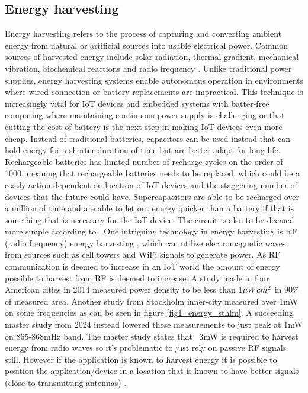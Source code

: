 \documentclass[article,a4paper]{IEEEtran}
\begin{document}
\subsection{Energy harvesting}
Energy harvesting refers to the process of capturing and converting ambient energy from natural or artificial sources into usable electrical power. Common sources of harvested energy include solar radiation, thermal gradient, mechanical vibration, biochemical reactions and radio frequency \cite{Energyharvest1}. Unlike traditional power supplies, energy harvesting systems enable autonomous operation in environments where wired connection or battery replacements are impractical. This technique is increasingly vital for IoT devices and embedded systems with batter-free computing where maintaining continuous power supply is challenging or that cutting the cost of battery is the next step in making IoT devices even more cheap. Instead of traditional batteries, capacitors can be used instead that can hold energy for a shorter duration of time but are better adapt for long life. Rechargeable batteries has limited number of recharge cycles on the order of 1000, meaning that rechargeable batteries needs to be replaced, which could be a costly action dependent on location of IoT devices and the staggering number of devices that the future could have. Supercapacitors are able to be recharged over a million of time and are able to let out energy quicker than a battery if that is something that is necessary for the IoT device. The circuit is also to be deemed more simple according to \cite{Energyharvest1}. 
\newline\newline 
One intriguing technology in energy harvesting is RF (radio frequency) energy harvesting \cite{RF_energy_harvest}, which can utilize electromagnetic waves from sources such as cell towers and WiFi signals to generate power. As RF communication is deemed to increase in an IoT world the amount of energy possible to harvest from RF is deemed to increase. A study made in four American cities in 2014 measured power density to be less than $1\mu W\/{cm}^2$ in 90\% of measured area. Another study from Stockholm inner-city measured over 1mW on some frequencies as can be seen in figure \ref{fig1_energy_sthlm}. A succeeding master study from 2024 instead lowered these measurements to just peak at 1mW on 865-868mHz band. The master study states that ~3mW is required to harvest energy from radio waves so it's problematic to just rely on passive RF signals still. However if the application is known to harvest energy it is possible to position the application/device in a location that is known to have better signals (close to transmitting antennas) \cite{Master_ambient_rf}.
\end{document}
